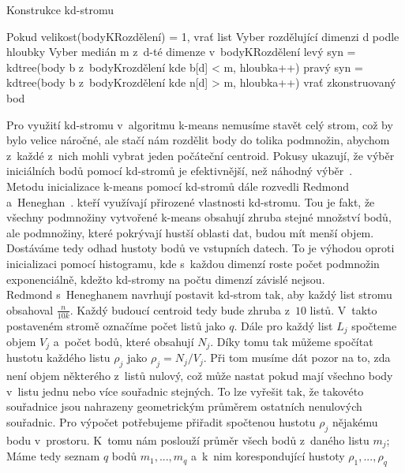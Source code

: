 \begin{algorithm}
\caption{Konstrukce kd-stromu}\label{alg:kdtreeconstruction}
\begin{algorithmic}[1]
\State Pokud velikost(bodyKRozdělení) = 1, vrať list
\State Vyber rozdělující dimenzi d podle hloubky
\State Vyber medián m z~d-té dimenze v~bodyKRozdělení
\State levý syn = kdtree(body b z~bodyKrozdělení kde b[d] < m, hloubka++)
\State pravý syn = kdtree(body b z~bodyKrozdělení kde n[d] > m, hloubka++)
\State vrať zkonstruovaný bod
\EndFunction
\end{algorithmic}
\end{algorithm}

Pro využití kd-stromu v~algoritmu k-means nemusíme stavět celý strom, což by bylo velice náročné, ale stačí nám rozdělit body do tolika podmnožin, abychom z~každé z~nich mohli vybrat jeden počáteční centroid. Pokusy ukazují, že výběr iniciálních bodů pomocí kd-stromů je efektivnější, než náhodný výběr~\cite{Pahala10}.\\

Metodu inicializace k-means pomocí kd-stromů dále rozvedli Redmond a~Heneghan~\cite{redmond07}. kteří využívají přirozené vlastnosti kd-stromu. Tou je fakt, že všechny podmnožiny vytvořené k-means obsahují zhruba stejné množství bodů, ale podmnožiny, které pokrývají hustší oblasti dat, budou mít menší objem. Dostáváme tedy odhad hustoty bodů ve vstupních datech. To je výhodou oproti inicializaci pomocí histogramu, kde s~každou dimenzí roste počet podmnožin exponenciálně, kdežto kd-stromy na počtu dimenzí závislé nejsou.\\

Redmond s~Heneghanem navrhují postavit kd-strom tak, aby každý list stromu obsahoval $\frac{n}{10k}$. Každý budoucí centroid tedy bude zhruba z~$10$ listů. V~takto postaveném stromě označíme počet listů jako $q$. Dále pro každý list $L_j$ spočteme objem $V_j$ a~počet bodů, které obsahují $N_j$. Díky tomu tak můžeme spočítat hustotu každého listu $\rho_j$ jako $\rho_j=N_j/V_j$. Při tom musíme dát pozor na to, zda není objem některého z~listů nulový, což může nastat pokud mají všechno body v~listu jednu nebo více souřadnic stejných. To lze vyřešit tak, že takovéto souřadnice jsou nahrazeny geometrickým průměrem ostatních nenulových souřadnic. Pro výpočet potřebujeme přiřadit spočtenou hustotu $\rho_j$ nějakému bodu v~prostoru. K~tomu nám poslouží průměr všech bodů z~daného listu $m_j$; Máme tedy seznam $q$ bodů $m_1,...,m_q$ a~k~nim korespondující hustoty $\rho_1,...,\rho_q$\\

